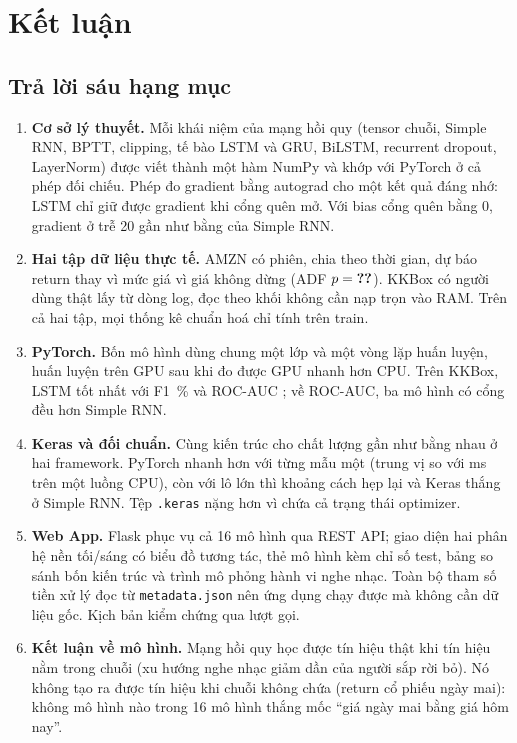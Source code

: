 \chapter{Kết luận}
\label{ch:ketluan}

\section{Trả lời sáu hạng mục}

\begin{enumerate}
  \item \textbf{Cơ sở lý thuyết.} Mỗi khái niệm của mạng hồi quy (tensor chuỗi, Simple RNN, BPTT, clipping, tế bào LSTM và
        GRU, BiLSTM, recurrent dropout, LayerNorm) được viết thành một hàm NumPy và khớp với PyTorch ở cả
         phép đối chiếu. Phép đo gradient bằng autograd cho một kết quả đáng nhớ: LSTM chỉ giữ được
        gradient khi cổng quên mở. Với bias cổng quên bằng 0, gradient ở trễ 20 gần như bằng của Simple RNN.
  \item \textbf{Hai tập dữ liệu thực tế.} AMZN có  phiên, chia theo thời gian, dự báo return thay vì mức
        giá vì giá không dừng (ADF $p = \SL{amzn/adf/close/p}$). KKBox có  người dùng thật lấy từ
         dòng log, đọc theo khối không cần nạp trọn vào RAM. Trên cả hai tập, mọi thống kê chuẩn hoá
        chỉ tính trên train.
  \item \textbf{PyTorch.} Bốn mô hình dùng chung một lớp và một vòng lặp huấn luyện, huấn luyện trên GPU sau khi đo được
        GPU nhanh hơn CPU. Trên KKBox, LSTM tốt nhất với F1 \,\% và ROC-AUC
        ; về ROC-AUC, ba mô hình có cổng đều hơn Simple RNN.
  \item \textbf{Keras và đối chuẩn.} Cùng kiến trúc cho chất lượng gần như bằng nhau ở hai framework. PyTorch nhanh hơn
        với từng mẫu một (trung vị  so với  ms trên một luồng CPU),
        còn với lô lớn thì khoảng cách hẹp lại và Keras thắng ở Simple RNN. Tệp \texttt{.keras} nặng hơn vì chứa cả trạng thái
        optimizer.
  \item \textbf{Web App.} Flask phục vụ cả 16 mô hình qua REST API; giao diện hai phân hệ nền tối/sáng có biểu đồ tương
        tác, thẻ mô hình kèm chỉ số test, bảng so sánh bốn kiến trúc và trình mô phỏng hành vi nghe nhạc. Toàn bộ tham số
        tiền xử lý đọc từ \texttt{metadata.json} nên ứng dụng chạy được mà không cần dữ liệu gốc. Kịch bản kiểm chứng qua
         lượt gọi.
  \item \textbf{Kết luận về mô hình.} Mạng hồi quy học được tín hiệu thật khi tín hiệu nằm trong chuỗi (xu hướng nghe nhạc
        giảm dần của người sắp rời bỏ). Nó không tạo ra được tín hiệu khi chuỗi không chứa (return cổ phiếu ngày mai):
        không mô hình nào trong 16 mô hình thắng mốc ``giá ngày mai bằng giá hôm nay''.
\end{enumerate}

